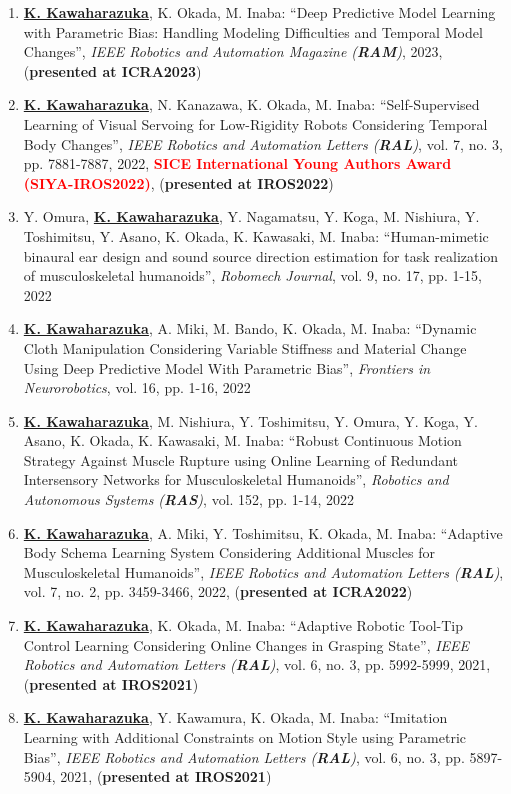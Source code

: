 \documentclass[letterpaper]{article}
\begin{document}
\begin{enumerate}
\item \underline{\textbf{K. Kawaharazuka}}, K. Okada, M. Inaba: ``Deep Predictive Model Learning with Parametric Bias: Handling Modeling Difficulties and Temporal Model Changes'', \textit{IEEE Robotics and Automation Magazine (\textit{\textbf{RAM}})}, 2023, (\textbf{presented at ICRA2023})
\item \underline{\textbf{K. Kawaharazuka}}, N. Kanazawa, K. Okada, M. Inaba: ``Self-Supervised Learning of Visual Servoing for Low-Rigidity Robots Considering Temporal Body Changes'', \textit{IEEE Robotics and Automation Letters (\textit{\textbf{RAL}})}, vol. 7, no. 3, pp. 7881-7887, 2022, \textbf{\textcolor{red}{SICE International Young Authors Award (SIYA-IROS2022)}}, (\textbf{presented at IROS2022})
\item Y. Omura, \underline{\textbf{K. Kawaharazuka}}, Y. Nagamatsu, Y. Koga, M. Nishiura, Y. Toshimitsu, Y. Asano, K. Okada, K. Kawasaki, M. Inaba: ``Human-mimetic binaural ear design and sound source direction estimation for task realization of musculoskeletal humanoids'', \textit{Robomech Journal}, vol. 9, no. 17, pp. 1-15, 2022
\item \underline{\textbf{K. Kawaharazuka}}, A. Miki, M. Bando, K. Okada, M. Inaba: ``Dynamic Cloth Manipulation Considering Variable Stiffness and Material Change Using Deep Predictive Model With Parametric Bias'', \textit{Frontiers in Neurorobotics}, vol. 16, pp. 1-16, 2022
\item \underline{\textbf{K. Kawaharazuka}}, M. Nishiura, Y. Toshimitsu, Y. Omura, Y. Koga, Y. Asano, K. Okada, K. Kawasaki, M. Inaba: ``Robust Continuous Motion Strategy Against Muscle Rupture using Online Learning of Redundant Intersensory Networks for Musculoskeletal Humanoids'', \textit{Robotics and Autonomous Systems (\textit{\textbf{RAS}})}, vol. 152, pp. 1-14, 2022
\item \underline{\textbf{K. Kawaharazuka}}, A. Miki, Y. Toshimitsu, K. Okada, M. Inaba: ``Adaptive Body Schema Learning System Considering Additional Muscles for Musculoskeletal Humanoids'', \textit{IEEE Robotics and Automation Letters (\textit{\textbf{RAL}})}, vol. 7, no. 2, pp. 3459-3466, 2022, (\textbf{presented at ICRA2022})
\item \underline{\textbf{K. Kawaharazuka}}, K. Okada, M. Inaba: ``Adaptive Robotic Tool-Tip Control Learning Considering Online Changes in Grasping State'', \textit{IEEE Robotics and Automation Letters (\textit{\textbf{RAL}})}, vol. 6, no. 3, pp. 5992-5999, 2021, (\textbf{presented at IROS2021})
\item \underline{\textbf{K. Kawaharazuka}}, Y. Kawamura, K. Okada, M. Inaba: ``Imitation Learning with Additional Constraints on Motion Style using Parametric Bias'', \textit{IEEE Robotics and Automation Letters (\textit{\textbf{RAL}})}, vol. 6, no. 3, pp. 5897-5904, 2021, (\textbf{presented at IROS2021})

\end{enumerate}
\end{document}
